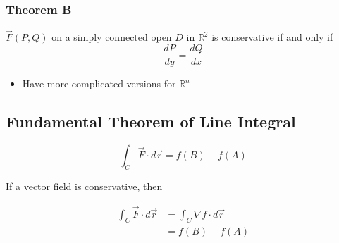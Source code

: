     \subsubsection{Theorem B}

      $ \vec{F}\left( P, Q \right) $ on a \ul{simply connected} open $ D $
      in $ \mathbb{R}^{2} $ is conservative if and only if
      \begin{equation}
        \frac{dP}{dy} = \frac{dQ}{dx}
      \end{equation}

      \begin{itemize}
        \item Have more complicated versions for $ \mathbb{R}^{n} $
      \end{itemize}

  \subsection{Fundamental Theorem of Line Integral}

    \begin{equation}
      \int_{C} \vec{F} \cdot d \vec{r} = f\left( B \right) - f\left( A \right)
    \end{equation}

    If a vector field is conservative, then

    \begin{align}
      \int_{C} \vec{F} \cdot d \vec{r}
        &= \int_{C} \nabla f \cdot d \vec{r} \\
        &= f\left( B \right) - f\left( A \right)
    \end{align}